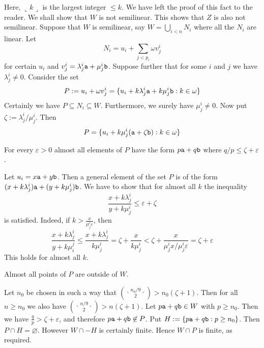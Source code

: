 Here, $\llcorner k\lrcorner$ is the largest integer $\leq k$.
We have left the proof of this fact to the reader.
We shall show that $W$ is not semilinear. This shows that $Z$
is also not semilinear. Suppose that $W$ is semilinear, say
$W = \bigcup_{i < n} N_i$ where all the $N_i$ are linear. Let
\begin{equation}
N_i = u_i + \sum_{j < p_i} \omega v^i_j
\end{equation}
for certain $u_i$ and $v^i_j = \lambda^i_j \mbox{\tt a} +
\mu^i_j \mbox{\tt b}$. Suppose further that for some $i$ and $j$
we have $\lambda^i_j \neq 0$. Consider the set
\begin{equation}
P := u_i + \omega v^i_j = \{ u_i + k\lambda^i_j \mbox{\tt a} +
    k\mu^i_j \mbox{\tt b} : k \in \omega\} 
\end{equation}
Certainly we have $P \subseteq N_i \subseteq W$. Furthermore, we
surely have $\mu^i_j \neq 0$. Now put $\zeta :=
\lambda^i_j/\mu^i_j$. Then
\begin{equation}
P = \{u_i + k\mu^i_j (\mbox{\tt a} + \zeta \mbox{\tt b}) : k \in \omega\}
\end{equation}
\begin{lem}
For every $\varepsilon > 0$ almost all elements of $P$
have the form $p\mbox{\tt a} + q\mbox{\tt b}$ where
$q/p \leq \zeta + \varepsilon$.
\end{lem}
\proofbeg
Let $u_i = x\mbox{\tt a} + y\mbox{\tt b}$. Then a general element
of the set $P$ is of the form $(x + k\lambda^i_j)\mbox{\tt a} +
(y + k\mu^i_j)\mbox{\tt b}$.  We have to show that for almost all
$k$ the inequality
\begin{equation}
\frac{x+ k\lambda^i_j}{y + k\mu^i_j} \leq \varepsilon + \zeta
\end{equation}
is satisfied. Indeed, if $k > \frac{x}{\mu^i_j \varepsilon}$, then
\begin{equation}
\frac{x + k\lambda^i_j}{y + k\mu^j_i} \leq
\frac{x + k\lambda^i_j}{k\mu^i_j} =
\zeta + \frac{x}{k \mu^i_j}
< \zeta + \frac{x}{\mu^i_j x/\mu^i_j \varepsilon}
= \zeta + \varepsilon
\end{equation}
This holds for almost all $k$.
\proofend
\begin{lem}
Almost all points of $P$ are outside of $W$.
\end{lem}
\proofbeg
Let $n_0$ be chosen in such a way that
${\llcorner n_0/9\lrcorner \choose 2} > n_0(\zeta + 1)$.
Then for all $n \geq n_0$ we also have
${\llcorner n/9\lrcorner \choose 2} > n(\zeta + 1)$.
Let $p\mbox{\tt a} + q \mbox{\tt b} \in W$ with $p \geq n_0$.
Then we have $\frac{q}{p} > \zeta + \varepsilon$, and therefore
$p\mbox{\tt a} + q \mbox{\tt b} \not\in P$. Put $H := \{p\mbox{\tt a} 
+ q\mbox{\tt b} : p \geq n_0\}$. Then $P \cap H = \varnothing$. 
However $W \cap - H$ is certainly finite. Hence $W \cap P$ is 
finite, as required.
\proofend

